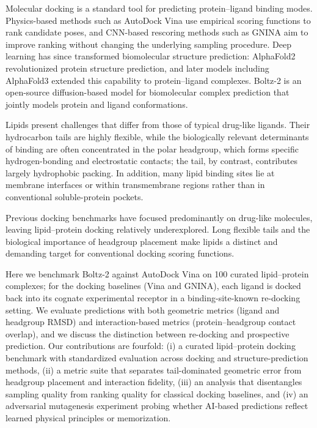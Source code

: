 \documentclass[journal=jcisd8,manuscript=article]{achemso}
\begin{document}
Molecular docking is a standard tool for predicting protein--ligand binding modes.\cite{kitchen2004docking}
Physics-based methods such as AutoDock Vina use empirical scoring functions to rank candidate poses,\cite{trott2010autodock} and CNN-based rescoring methods such as GNINA aim to improve ranking without changing the underlying sampling procedure.\cite{mcnutt2025gnina13}
Deep learning has since transformed biomolecular structure prediction: AlphaFold2 revolutionized protein structure prediction,\cite{jumper2021highly} and later models including AlphaFold3 extended this capability to protein--ligand complexes.\cite{abramson2024accurate}
Boltz-2 is an open-source diffusion-based model for biomolecular complex prediction that jointly models protein and ligand conformations.\cite{passaro2025boltz2,wohlwend2024boltz}

Lipids present challenges that differ from those of typical drug-like ligands.
Their hydrocarbon tails are highly flexible, while the biologically relevant determinants of binding are often concentrated in the polar headgroup, which forms specific hydrogen-bonding and electrostatic contacts; the tail, by contrast, contributes largely hydrophobic packing.
In addition, many lipid binding sites lie at membrane interfaces or within transmembrane regions rather than in conventional soluble-protein pockets.

Previous docking benchmarks have focused predominantly on drug-like molecules,\cite{wang2016comprehensive,su2019comparative} leaving lipid--protein docking relatively underexplored.
Long flexible tails and the biological importance of headgroup placement make lipids a distinct and demanding target for conventional docking scoring functions.

Here we benchmark Boltz-2 against AutoDock Vina on 100 curated lipid--protein complexes; for the docking baselines (Vina and GNINA), each ligand is docked back into its cognate experimental receptor in a binding-site-known re-docking setting.
We evaluate predictions with both geometric metrics (ligand and headgroup RMSD) and interaction-based metrics (protein--headgroup contact overlap), and we discuss the distinction between re-docking and prospective prediction.
Our contributions are fourfold: (i) a curated lipid--protein docking benchmark with standardized evaluation across docking and structure-prediction methods, (ii) a metric suite that separates tail-dominated geometric error from headgroup placement and interaction fidelity, (iii) an analysis that disentangles sampling quality from ranking quality for classical docking baselines, and (iv) an adversarial mutagenesis experiment probing whether AI-based predictions reflect learned physical principles or memorization.
\end{document}
